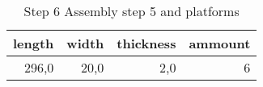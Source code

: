 \begin{table}[h!]
\centering
\caption{Step 6 Assembly step 5 and platforms}
\begin{tabular}{rrrr}
\toprule
 length &  width &  thickness &  ammount \\
\midrule
  296,0 &   20,0 &        2,0 &        6 \\
\bottomrule
\end{tabular}
\end{table}
